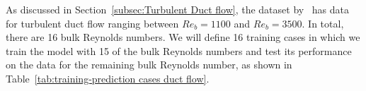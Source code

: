 \documentclass[11pt]{article}
\numberwithin{equation}{section}
\theoremstyle{plain}
\theoremstyle{definition}
\begin{document}


As discussed in Section~\ref{subsec:Turbulent Duct flow}, the dataset by~\cite{mcconkey2021curated} has data for turbulent duct flow ranging between $Re_{b}=1100$ and $Re_{b}=3500$. In total, there are 16 bulk Reynolds numbers. We will define 16 training cases in which we train the model with 15 of the bulk Reynolds numbers and test its performance on the data for the remaining bulk Reynolds number, as shown in Table~\ref{tab:training-prediction cases duct flow}.
\end{document}

